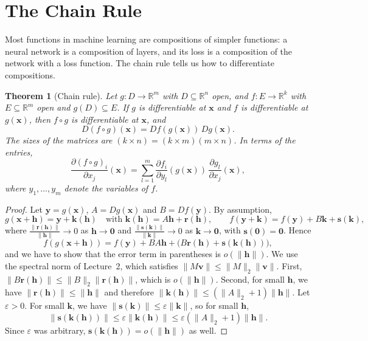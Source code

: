 \documentclass[11pt]{article}
\newcommand{\norm}[1]{\lVert #1 \rVert}
\theoremstyle{definition}
\theoremstyle{plain}
\newtheorem{theorem}[definition]{Theorem}
\theoremstyle{remark}
\begin{document}
\section{The Chain Rule}\label{sec:chain-rule}

Most functions in machine learning are compositions of simpler functions: a neural network is a composition of layers, and its loss is a composition of the network with a loss function. The chain rule tells us how to differentiate compositions.

\begin{theorem}[Chain rule]\label{thm:chain-rule}
    Let $g: D \to \mathbb{R}^m$ with $D \subseteq \mathbb{R}^n$ open, and $f: E \to \mathbb{R}^k$ with $E \subseteq \mathbb{R}^m$ open and $g(D) \subseteq E$. If $g$ is differentiable at $\mathbf{x}$ and $f$ is differentiable at $g(\mathbf{x})$, then $f \circ g$ is differentiable at $\mathbf{x}$, and
    \[D(f \circ g)(\mathbf{x}) = Df(g(\mathbf{x})) \, Dg(\mathbf{x}).\]
    The sizes of the matrices are $(k \times n) = (k \times m)(m \times n)$. In terms of the entries,
    \[\frac{\partial (f \circ g)_i}{\partial x_j}(\mathbf{x}) = \sum_{l=1}^m \frac{\partial f_i}{\partial y_l}(g(\mathbf{x})) \, \frac{\partial g_l}{\partial x_j}(\mathbf{x}),\]
    where $y_1, \ldots, y_m$ denote the variables of $f$.
\end{theorem}

\begin{proof}
    Let $\mathbf{y} = g(\mathbf{x})$, $A = Dg(\mathbf{x})$ and $B = Df(\mathbf{y})$. By assumption,
    \[g(\mathbf{x} + \mathbf{h}) = \mathbf{y} + \mathbf{k}(\mathbf{h}) \quad \text{with } \mathbf{k}(\mathbf{h}) = A\mathbf{h} + \mathbf{r}(\mathbf{h}), \qquad f(\mathbf{y} + \mathbf{k}) = f(\mathbf{y}) + B\mathbf{k} + \mathbf{s}(\mathbf{k}),\]
    where $\frac{\norm{\mathbf{r}(\mathbf{h})}}{\norm{\mathbf{h}}} \to 0$ as $\mathbf{h} \to \mathbf{0}$ and $\frac{\norm{\mathbf{s}(\mathbf{k})}}{\norm{\mathbf{k}}} \to 0$ as $\mathbf{k} \to \mathbf{0}$, with $\mathbf{s}(\mathbf{0}) = \mathbf{0}$. Hence
    \[f(g(\mathbf{x} + \mathbf{h})) = f(\mathbf{y}) + BA\mathbf{h} + \big(B\mathbf{r}(\mathbf{h}) + \mathbf{s}(\mathbf{k}(\mathbf{h}))\big),\]
    and we have to show that the error term in parentheses is $o(\norm{\mathbf{h}})$. We use the spectral norm of Lecture~2, which satisfies $\norm{M\mathbf{v}} \leq \norm{M}_2 \norm{\mathbf{v}}$. First, $\norm{B\mathbf{r}(\mathbf{h})} \leq \norm{B}_2 \norm{\mathbf{r}(\mathbf{h})}$, which is $o(\norm{\mathbf{h}})$. Second, for small $\mathbf{h}$, we have $\norm{\mathbf{r}(\mathbf{h})} \leq \norm{\mathbf{h}}$ and therefore $\norm{\mathbf{k}(\mathbf{h})} \leq (\norm{A}_2 + 1)\norm{\mathbf{h}}$. Let $\varepsilon > 0$. For small $\mathbf{k}$, we have $\norm{\mathbf{s}(\mathbf{k})} \leq \varepsilon \norm{\mathbf{k}}$, so for small $\mathbf{h}$,
    \[\norm{\mathbf{s}(\mathbf{k}(\mathbf{h}))} \leq \varepsilon \norm{\mathbf{k}(\mathbf{h})} \leq \varepsilon (\norm{A}_2 + 1) \norm{\mathbf{h}}.\]
    Since $\varepsilon$ was arbitrary, $\mathbf{s}(\mathbf{k}(\mathbf{h})) = o(\norm{\mathbf{h}})$ as well.
\end{proof}
\end{document}
